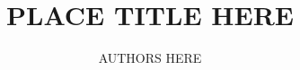 \documentclass[10pt,twocolumn,letterpaper]{article}
\begin{document}
\title{\LARGE~\\[-8.0ex] PLACE TITLE HERE}
\author{AUTHORS HERE}


\date{}
\maketitle










\begin{footnotesize}


\end{footnotesize}
\end{document}
